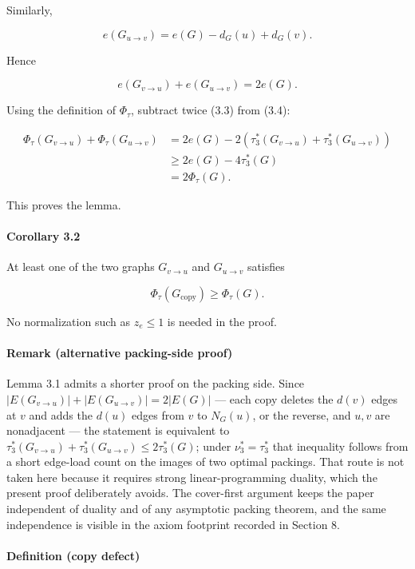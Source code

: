 \documentclass[
  american,
  11pt,
  a4paper,
]{article}
\begin{document}
Similarly,

\[
e(G_{u\to v})
=
e(G)-d_G(u)+d_G(v).
\]

Hence

\[
e(G_{v\to u})+e(G_{u\to v})=2e(G).
\tag{3.4}
\]

Using the definition of \(\Phi_\tau\), subtract twice (3.3) from (3.4):

\[
\begin{aligned}
\Phi_\tau(G_{v\to u})
+
\Phi_\tau(G_{u\to v})
&=
2e(G)
-
2\left(
\tau_3^*(G_{v\to u})
+
\tau_3^*(G_{u\to v})
\right)\\
&\ge
2e(G)-4\tau_3^*(G)\\
&=
2\Phi_\tau(G).
\end{aligned}
\]

This proves the lemma.

\paragraph{Corollary 3.2}\label{corollary-3.2}

At least one of the two graphs \(G_{v\to u}\) and \(G_{u\to v}\) satisfies

\[
\Phi_\tau(G_{\mathrm{copy}})\ge\Phi_\tau(G).
\]

No normalization such as \(z_e\le1\) is needed in the proof.

\paragraph{Remark (alternative packing-side proof)}\label{remark-alternative-packing-side-proof}

Lemma 3.1 admits a shorter proof on the packing side. Since \(|E(G_{v\to u})|+|E(G_{u\to v})|=2|E(G)|\) --- each copy deletes the \(d(v)\) edges at \(v\) and adds the \(d(u)\) edges from \(v\) to \(N_G(u)\), or the reverse, and \(u,v\) are nonadjacent --- the statement is equivalent to \(\tau_3^*(G_{v\to u})+\tau_3^*(G_{u\to v})\le2\tau_3^*(G)\); under \(\nu_3^*=\tau_3^*\) that inequality follows from a short edge-load count on the images of two optimal packings. That route is not taken here because it requires strong linear-programming duality, which the present proof deliberately avoids. The cover-first argument keeps the paper independent of duality and of any asymptotic packing theorem, and the same independence is visible in the axiom footprint recorded in Section 8.

\paragraph{Definition (copy defect)}\label{definition-copy-defect}
\end{document}
